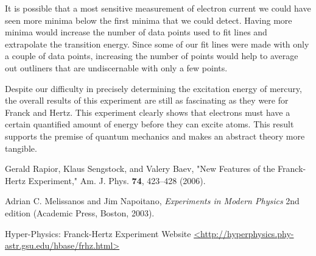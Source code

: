 \documentclass[prb,preprint]{revtex4-1}
\begin{document}
It is possible that a most sensitive measurement of electron current we could have seen more minima below the first minima that we could detect. Having more minima would increase the number of data points used to fit lines and extrapolate the transition energy. Since some of our fit lines were made with only a couple of data points, increasing the number of points would help to average out outliners that are undiscernable with only a few points. 

Despite our difficulty in precisely determining the excitation energy of mercury, the overall results of this experiment are still as fascinating as they were for Franck and Hertz. This experiment clearly shows that electrons must have a certain quantified amount of energy before they can excite atoms. This result supports the premise of quantum mechanics and makes an abstract theory more tangible.

\begin{thebibliography}{9}


 Gerald Rapior, Klaus Sengstock, and Valery Baev, "New Features of the Franck-Hertz Experiment,"  Am. J. Phys. \textbf{74}, 423--428 (2006). 

 Adrian C. Melissanos and Jim Napoitano, \textit{Experiments in Modern Physics} 2nd edition (Academic Press, Boston, 2003).

 Hyper-Physics: Franck-Hertz Experiment Website \url{<http://hyperphysics.phy-astr.gsu.edu/hbase/frhz.html>}

\end{thebibliography}
\end{document}
